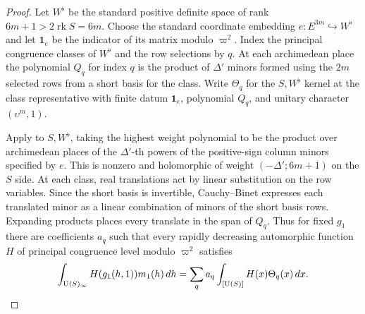 \begin{proof}
Let $W^\flat$ be the standard positive definite space of rank $6m+1>2\operatorname{rk}S=6m$. Choose the standard coordinate embedding $e:E^{3m}\hookrightarrow W^\flat$ and let $\mathbf 1_e$ be the indicator of its matrix modulo $\varpi^2$. Index the principal congruence classes of $W^\flat$ and the row selections by $q$. At each archimedean place the polynomial $Q_q$ for index $q$ is the product of $\Delta'$ minors formed using the $2m$ selected rows from a short basis for the class. Write $\Theta_q$ for the $S,W^\flat$ kernel at the class representative with finite datum $\mathbf 1_e$, polynomial $Q_q$, and unitary character $(\upsilon^m,1)$.

Apply  to $S,W^\flat$, taking the highest weight polynomial to be the product over archimedean places of the $\Delta'$-th powers of the positive-sign column minors specified by $e$. This is nonzero and holomorphic of weight $(-\Delta';6m+1)$ on the $S$ side. At each class, real translations act by linear substitution on the row variables. Since the short basis is invertible, Cauchy--Binet expresses each translated minor as a linear combination of minors of the short basis rows. Expanding products places every translate in the span of $Q_q$. Thus for fixed $g_1$ there are coefficients $a_q$ such that every rapidly decreasing automorphic function $H$ of principal congruence level modulo $\varpi^2$ satisfies
\[
 \int_{\operatorname{U}(S)_\infty} H(g_1(h,1))m_1(h)\,dh
 =\sum_q a_q\int_{[\operatorname{U}(S)]}H(x)\Theta_q(x)\,dx .
\]


\end{proof}

